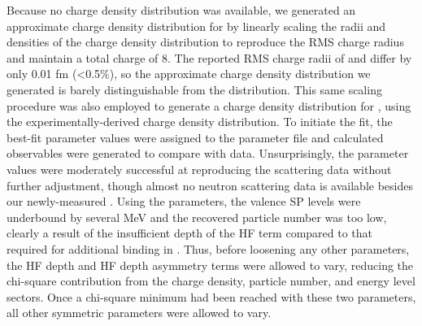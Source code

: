 Because no \oEight charge density distribution was available, we generated an approximate charge density
distribution for \oEight by linearly scaling
the radii and densities of the \oSix charge density distribution to reproduce the \oEight RMS charge
radius and maintain a total charge of 8. The reported RMS charge radii of \oSix and \oEight differ by only
0.01 fm (<0.5\%), so the approximate \oEight charge density distribution we generated is barely
distinguishable from the \oSix distribution. This same scaling procedure was also employed to
generate a charge density distribution for \snTwelve, using the
experimentally-derived \snFour charge density distribution. To initiate the fit, the \oSix best-fit parameter values
were assigned to the \oEight parameter file and calculated observables were generated to compare
with \oEight data. Unsurprisingly, the \oSix parameter values were moderately successful at reproducing
the \oEight scattering data without further adjustment, though almost no neutron scattering data is
available besides our newly-measured \tot. Using the \oSix parameters, the \oEight valence SP levels were underbound
by several MeV and the recovered particle number was too low, clearly a result of the insufficient
depth of the \oSix HF term compared to that required for additional binding in \oEight. Thus, before
loosening any other parameters, the HF depth and HF depth asymmetry terms were allowed to vary,
reducing the chi-square contribution from the charge density, particle number, and energy level
sectors. Once a chi-square minimum had been reached with these two parameters, all other symmetric parameters
were allowed to vary.

